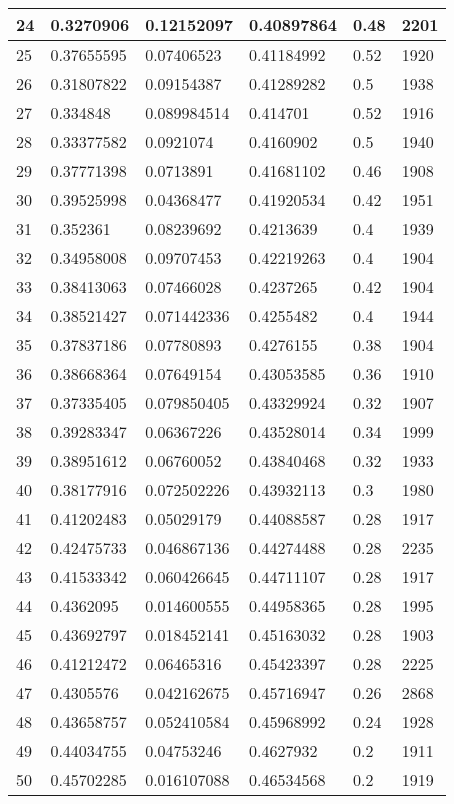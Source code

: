 \begin{longtable}{|l|l|l|l|l|l|}
24 & 0.3270906 & 0.12152097 & 0.40897864 & 0.48 & 2201 \\ \hline 
25 & 0.37655595 & 0.07406523 & 0.41184992 & 0.52 & 1920 \\ \hline 
26 & 0.31807822 & 0.09154387 & 0.41289282 & 0.5 & 1938 \\ \hline 
27 & 0.334848 & 0.089984514 & 0.414701 & 0.52 & 1916 \\ \hline 
28 & 0.33377582 & 0.0921074 & 0.4160902 & 0.5 & 1940 \\ \hline 
29 & 0.37771398 & 0.0713891 & 0.41681102 & 0.46 & 1908 \\ \hline 
30 & 0.39525998 & 0.04368477 & 0.41920534 & 0.42 & 1951 \\ \hline 
31 & 0.352361 & 0.08239692 & 0.4213639 & 0.4 & 1939 \\ \hline 
32 & 0.34958008 & 0.09707453 & 0.42219263 & 0.4 & 1904 \\ \hline 
33 & 0.38413063 & 0.07466028 & 0.4237265 & 0.42 & 1904 \\ \hline 
34 & 0.38521427 & 0.071442336 & 0.4255482 & 0.4 & 1944 \\ \hline 
35 & 0.37837186 & 0.07780893 & 0.4276155 & 0.38 & 1904 \\ \hline 
36 & 0.38668364 & 0.07649154 & 0.43053585 & 0.36 & 1910 \\ \hline 
37 & 0.37335405 & 0.079850405 & 0.43329924 & 0.32 & 1907 \\ \hline 
38 & 0.39283347 & 0.06367226 & 0.43528014 & 0.34 & 1999 \\ \hline 
39 & 0.38951612 & 0.06760052 & 0.43840468 & 0.32 & 1933 \\ \hline 
40 & 0.38177916 & 0.072502226 & 0.43932113 & 0.3 & 1980 \\ \hline 
41 & 0.41202483 & 0.05029179 & 0.44088587 & 0.28 & 1917 \\ \hline 
42 & 0.42475733 & 0.046867136 & 0.44274488 & 0.28 & 2235 \\ \hline 
43 & 0.41533342 & 0.060426645 & 0.44711107 & 0.28 & 1917 \\ \hline 
44 & 0.4362095 & 0.014600555 & 0.44958365 & 0.28 & 1995 \\ \hline 
45 & 0.43692797 & 0.018452141 & 0.45163032 & 0.28 & 1903 \\ \hline 
46 & 0.41212472 & 0.06465316 & 0.45423397 & 0.28 & 2225 \\ \hline 
47 & 0.4305576 & 0.042162675 & 0.45716947 & 0.26 & 2868 \\ \hline 
48 & 0.43658757 & 0.052410584 & 0.45968992 & 0.24 & 1928 \\ \hline 
49 & 0.44034755 & 0.04753246 & 0.4627932 & 0.2 & 1911 \\ \hline 
50 & 0.45702285 & 0.016107088 & 0.46534568 & 0.2 & 1919 \\ \hline 
\end{longtable}